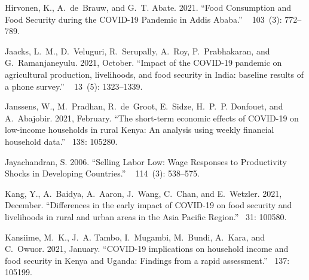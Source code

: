\documentclass{wber}
\begin{document}
\begin{thebibliography}{}
Hirvonen, K., A.~de~Brauw, and G.~T. Abate. 2021.
\newblock ``Food {Consumption} and {Food} {Security} during the {COVID}-19
  {Pandemic} in {Addis} {Ababa}.''
~{ 103\/}~(3):
  772--789.

Jaacks, L.~M., D.~Veluguri, R.~Serupally, A.~Roy, P.~Prabhakaran, and
  G.~Ramanjaneyulu. 2021, October.
\newblock ``Impact of the {COVID}-19 pandemic on agricultural production,
  livelihoods, and food security in {India}: baseline results of a phone
  survey.''
~{ 13\/}~(5): 1323--1339.

Janssens, W., M.~Pradhan, R.~de~Groot, E.~Sidze, H.~P.~P. Donfouet, and
  A.~Abajobir. 2021, February.
\newblock ``The short-term economic effects of {COVID}-19 on low-income
  households in rural {Kenya}: {An} analysis using weekly financial household
  data.''
~{138}: 105280.

Jayachandran, S. 2006.
\newblock ``Selling {Labor} {Low}: {Wage} {Responses} to {Productivity}
  {Shocks} in {Developing} {Countries}.''
~{ 114\/}~(3): 538--575.

Kang, Y., A.~Baidya, A.~Aaron, J.~Wang, C.~Chan, and E.~Wetzler. 2021,
  December.
\newblock ``Differences in the early impact of {COVID}-19 on food security and
  livelihoods in rural and urban areas in the {Asia} {Pacific} {Region}.''
~{31}: 100580.

Kansiime, M.~K., J.~A. Tambo, I.~Mugambi, M.~Bundi, A.~Kara, and C.~Owuor.
  2021, January.
\newblock ``{COVID}-19 implications on household income and food security in
  {Kenya} and {Uganda}: {Findings} from a rapid assessment.''
~{137}: 105199.


\end{thebibliography}
\end{document}
